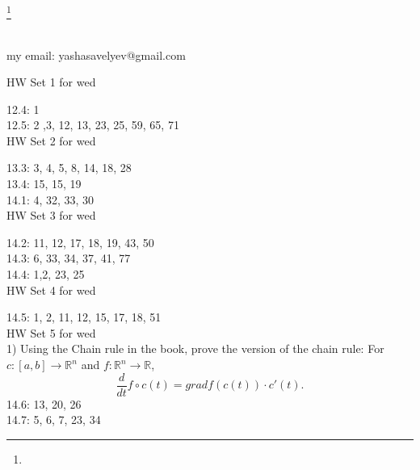 \documentclass{amsart}
\numberwithin{equation}{section}
\theoremstyle{definition}
\theoremstyle{remark}
\begin{document}
\title{}
\author{Yasha Savelyev}
\thanks {}
\address{University of Colima, CUICBAS}
\keywords{}
\begin{abstract}   
\end{abstract}
\maketitle
\section{}
my email: yashasavelyev@gmail.com

HW Set 1 for wed

12.4: 1  \\
12.5: 2 ,3, 12, 13, 23, 25, 59, 65, 71  \\

HW Set 2 for wed

13.3: 3, 4, 5, 8, 14, 18, 28  \\
13.4: 15, 15, 19 \\
14.1: 4, 32, 33, 30 \\

HW Set 3 for wed

14.2: 11, 12, 17, 18, 19, 43, 50 \\
14.3: 6, 33, 34, 37, 41, 77 \\
14.4: 1,2, 23, 25 \\

HW Set 4 for wed

14.5: 1, 2, 11, 12, 15, 17, 18, 51 \\

HW Set 5 for wed \\

1) Using the Chain rule in the book, prove the version of the chain rule:
For $c: [a,b] \to \mathbb{R} ^{n}$ and $f: \mathbb{R} ^{n}
\to \mathbb{R}$, $$\frac{d}{dt} f \circ c (t)  = grad f (c (t)
) \cdot c' (t).$$ 
14.6: 13, 20, 26 \\
14.7: 5, 6, 7, 23, 34 \\
\end{document}
